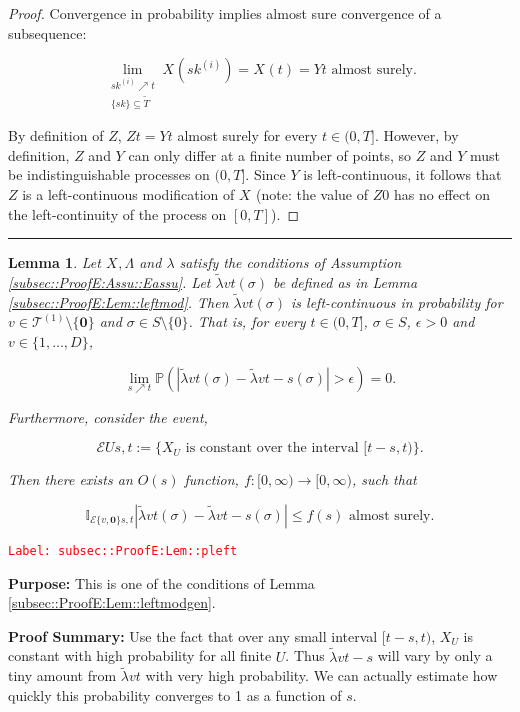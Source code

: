 \documentclass[12pt]{article}
\newcommand{\mb}{\mathbb}
\newcommand{\mc}{\mathcal}
\newcommand{\ra}{\rightarrow}
\newcommand{\te}{\text}
\newcommand{\ep}{\epsilon}
\newcommand{\tr}{\textcolor{red}}
\newcommand{\labe}[1]{\tr{\texttt{Label: #1}}}
\newcommand{\purpose}{\textbf{Purpose: }}
\newcommand{\pfsum}{\textbf{Proof Summary: }}
\newcommand{\lin}{\rule{\linewidth}{0.4 pt}}
\newcommand{\pr}{\mb{P}}							%
\renewcommand{\root}{\mathbf{0}}				%
\renewcommand{\v}{v}							%
\renewcommand{\U}{U}							%
\renewcommand{\S}{S}							%
\newcommand{\s}{\sigma}							%
\newcommand{\T}{T}								%
\renewcommand{\t}{t}							%
\renewcommand{\tt}{s}							%
\newcommand{\X}{X}								%
\newcommand{\cind}[1]{_{#1}}					%
\newcommand{\tp}[1]{(#1)}						%
\newcommand{\tip}[1]{#1}						%
\newcommand{\degr}{D}							%
\newcommand{\tree}{\mc{T}}						%
\newcommand{\sln}[1]{^{(#1)}}					%
\newcommand{\rate}{\lambda}						%
\newcommand{\alt}[1]{\widetilde{#1}}			%
\newcommand{\XX}{Y}								%
\newcommand{\XXX}{Z}							%
\renewcommand{\it}{k}							%
\newcommand{\evnt}{\mc{E}}						%
\newcommand{\Tset}{\alt{T}}						%
\newcommand{\ratee}{\Lambda}					%
\newcommand{\crate}{\alt{\lambda}}				%
\newtheorem{lem}[thms]{Lemma}
\begin{document}
\begin{proof}
Convergence in probability implies almost sure convergence of a subsequence:

\[\lim_{\substack{\tt{\it\sln{i}} \nearrow \t\\\{\tt{\it}\}\subseteq \Tset}} \X\cind{}\tp{\tt{\it\sln{i}}} = \X\cind{}\tp{\t} = \XX{}{\t} \te{ almost surely.}\]

By definition of \(\XXX{}{}\), \(\XXX{}{\t} = \XX{}{\t}\) almost surely for every \(\t \in (0,\T]\). However, by definition, \(\XXX{}{}\) and \(\XX{}{}\) can only differ at a finite number of points, so \(\XXX{}{}\) and \(\XX{}{}\) must be indistinguishable processes on \((0,\T]\). Since \(\XX{}{}\) is left-continuous, it follows that \(\XXX{}{}\) is a left-continuous modification of \(\X\cind{}\tip{}\) (note: the value of \(\XXX{}{0}\) has no effect on the left-continuity of the process on \([0,\T]\)).
\end{proof}

\lin

\begin{lem}
Let \(\X\cind{}\tip{},\ratee{}{}\) and \(\rate{}\) satisfy the conditions of Assumption \ref{subsec::ProofE:Assu::Eassu}. Let \(\crate{\v}{\t}(\s)\) be defined as in Lemma \ref{subsec::ProofE:Lem::leftmod}. Then \(\crate{\v}{\t}(\s)\) is left-continuous in probability for \(\v \in \tree\sln{1}\setminus\{\root\}\) and \(\s \in \S\setminus\{0\}\). That is, for every \(\t \in (0,\T]\), \(\s \in \S\), \(\ep > 0\) and \(\v\in \{1,\dots,\degr\}\),

\[\lim_{\tt \nearrow \t}\pr\left(|\crate{\v}{\t}(\s)- \crate{\v}{\t-\tt}(\s)| > \ep\right) = 0.\]

Furthermore, consider the event,

\[\evnt{\U}{\tt,\t} := \{\X\cind{\U}\tip{} \te{ is constant over the interval } [\t-\tt,\t)\}.\]

Then there exists an \(O(\tt)\) function, \(f:[0,\infty)\ra[0,\infty)\), such that 

\[\mb{I}_{\evnt{\{\v,\root\}}{\tt,\t}}|\crate{\v}{\t}(\s) - \crate{\v}{\t-\tt}(\s)| \leq f(\tt) \te{ almost surely.}\]
\label{subsec::ProofE:Lem::pleft}
\end{lem}
\labe{subsec::ProofE:Lem::pleft}

\purpose This is one of the conditions of Lemma \ref{subsec::ProofE:Lem::leftmodgen}.

\pfsum Use the fact that over any small interval \([\t-\tt,\t)\), \(\X\cind{U}\) is constant with high probability for all finite \(U\). Thus \(\crate{v}{\t-\tt}\) will vary by only a tiny amount from \(\crate{v}{\t}\) with very high probability. We can actually estimate how quickly this probability converges to 1 as a function of \(s\).
\end{document}
